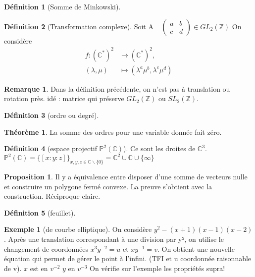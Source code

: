 \documentclass{article}
\newcommand{\C}{\mathbb{C}} %
\newcommand{\Proj}{\mathbb{P}} %
\newcommand{\Z}{\mathbb{Z}} %
\theoremstyle{definition} %
\newtheorem{defi}{Définition}
\newtheorem{rmq}{Remarque}
\newtheorem{thm}{Théorème}
\newtheorem{prop}{Proposition}
\newtheorem{ex}{Exemple}
\newcommand{\1}{\mathbb{1}} %
\begin{document}
\begin{defi}[Somme de Minkowski]

\end{defi}

\begin{defi}[Transformation complexe]
Soit A=
$\begin{pmatrix}
   a & b \\
   c & d
\end{pmatrix}
\in GL_2(\Z)$
On considère
\begin{align*} f : (\C^*)^2 &\to (\C^*)^2, \\
(\lambda,\mu) &\mapsto (\lambda^{a} \mu^{b},\lambda^{c} \mu^{d})
\end{align*}

\end{defi}

\begin{rmq}
Dans la définition précédente,
on n'est pas à translation ou rotation près.
idé : matrice qui préserve $GL_2(\Z)$ ou $SL_2(\Z)$.
\end{rmq}



\begin{defi}[ordre ou degré]

\end{defi}

\begin{thm}
La somme des ordres pour une variable donnée fait zéro.
\end{thm}

\begin{defi}[espace projectif $\Proj^2 (\C)$]
Ce sont les droites de $\C^3$.
$\Proj^2 (\C)=\{ [x:y:z] \}_{x,y,z \in \C \backslash \{0\}}=\C^2 \cup \C \cup \{\infty\} $
\end{defi}

\begin{prop}
Il y a équivalence entre disposer d'une somme de vecteurs nulle et construire un polygone fermé convexe.
La preuve s'obtient avec la construction. Réciproque claire.
\end{prop}

\begin{defi}[feuillet]

\end{defi}

\begin{ex}[de courbe elliptique]
On considère $y^2 - (x+1)(x-1)(x-2)$.
Après une translation correspondant à une division par y², on utilise le changement de coordonnées $x^3 y^{-2}= u$ et $xy^{-1}=v$. On obtient une nouvelle équation qui permet de gérer le point à l'infini. (TFI et u coordonnée raisonnable de v).
$x$ est en $v^{-2}$ 
$y$ en $v^{-3}$
On vérifie sur l'exemple les propriétés supra!
\end{ex}
\end{document}
